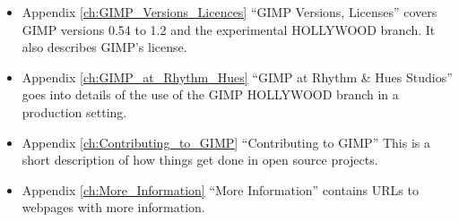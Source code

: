 \begin{itemize}

\item Appendix  \ref{ch:GIMP_Versions_Licences} ``GIMP Versions, Licenses''
covers GIMP versions 0.54 to 1.2 and the experimental HOLLYWOOD branch. It also
describes GIMP's license.
  
\item Appendix  \ref{ch:GIMP_at_Rhythm_Hues}  ``GIMP at Rhythm \& Hues
Studios'' goes into details of the use of the GIMP HOLLYWOOD branch in a
production setting. 

\item Appendix \ref{ch:Contributing_to_GIMP} ``Contributing to GIMP'' This is a
short description of how things get done in open source projects.

\item Appendix \ref{ch:More_Information} ``More Information'' contains URLs to
webpages with more information.

\end{itemize}
